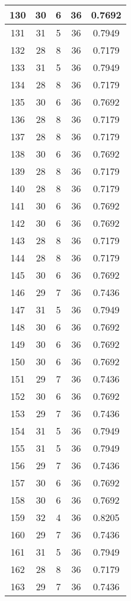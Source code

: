 \documentclass[letterpaper, 12pt]{article}
\begin{document}
\begin{longtable}{|c|c|c|c|c|}
\hline
130 & 30 & 6 & 36 & 0.7692 \\
\hline
131 & 31 & 5 & 36 & 0.7949 \\
\hline
132 & 28 & 8 & 36 & 0.7179 \\
\hline
133 & 31 & 5 & 36 & 0.7949 \\
\hline
134 & 28 & 8 & 36 & 0.7179 \\
\hline
135 & 30 & 6 & 36 & 0.7692 \\
\hline
136 & 28 & 8 & 36 & 0.7179 \\
\hline
137 & 28 & 8 & 36 & 0.7179 \\
\hline
138 & 30 & 6 & 36 & 0.7692 \\
\hline
139 & 28 & 8 & 36 & 0.7179 \\
\hline
140 & 28 & 8 & 36 & 0.7179 \\
\hline
141 & 30 & 6 & 36 & 0.7692 \\
\hline
142 & 30 & 6 & 36 & 0.7692 \\
\hline
143 & 28 & 8 & 36 & 0.7179 \\
\hline
144 & 28 & 8 & 36 & 0.7179 \\
\hline
145 & 30 & 6 & 36 & 0.7692 \\
\hline
146 & 29 & 7 & 36 & 0.7436 \\
\hline
147 & 31 & 5 & 36 & 0.7949 \\
\hline
148 & 30 & 6 & 36 & 0.7692 \\
\hline
149 & 30 & 6 & 36 & 0.7692 \\
\hline
150 & 30 & 6 & 36 & 0.7692 \\
\hline
151 & 29 & 7 & 36 & 0.7436 \\
\hline
152 & 30 & 6 & 36 & 0.7692 \\
\hline
153 & 29 & 7 & 36 & 0.7436 \\
\hline
154 & 31 & 5 & 36 & 0.7949 \\
\hline
155 & 31 & 5 & 36 & 0.7949 \\
\hline
156 & 29 & 7 & 36 & 0.7436 \\
\hline
157 & 30 & 6 & 36 & 0.7692 \\
\hline
158 & 30 & 6 & 36 & 0.7692 \\
\hline
159 & 32 & 4 & 36 & 0.8205 \\
\hline
160 & 29 & 7 & 36 & 0.7436 \\
\hline
161 & 31 & 5 & 36 & 0.7949 \\
\hline
162 & 28 & 8 & 36 & 0.7179 \\
\hline
163 & 29 & 7 & 36 & 0.7436 \\

\end{longtable}
\end{document}
